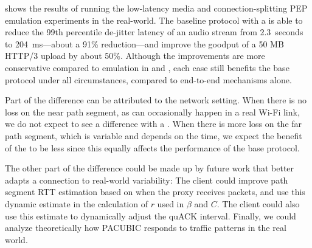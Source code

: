 %
%
 shows the results of running the low-latency media and
connection-splitting PEP emulation experiments in the real-world. The baseline
protocol with a \sys is able to
reduce the 99th percentile de-jitter latency of an audio stream
from 2.3~seconds to 204~ms---about a 91\% reduction---and
improve the goodput of a 50 MB HTTP/3 upload by about 50\%.
Although the improvements are more conservative compared to emulation in
 and , each case still benefits the
base protocol under all circumstances, compared to end-to-end mechanisms alone.

Part of the difference can be attributed to the network setting. When there is
no loss on the near path segment, as can occasionally happen in a real Wi-Fi link,
we do not expect to
see a difference with a \sys. When there is more loss on the far path segment, which
is variable and depends on the time, we
expect the benefit of the \sys to be less since this equally affects the
performance of the base protocol.

The other part of the difference could be made up by future work that better
adapts a \sys connection to real-world variability: The client could improve
path segment RTT estimation based on when the proxy receives packets, and use this
dynamic estimate in the calculation of $r$ used in $\beta$ and $C$.
The client could also use
this estimate to dynamically adjust the quACK interval.
Finally, we could analyze theoretically how PACUBIC responds
to traffic patterns in the real world.
